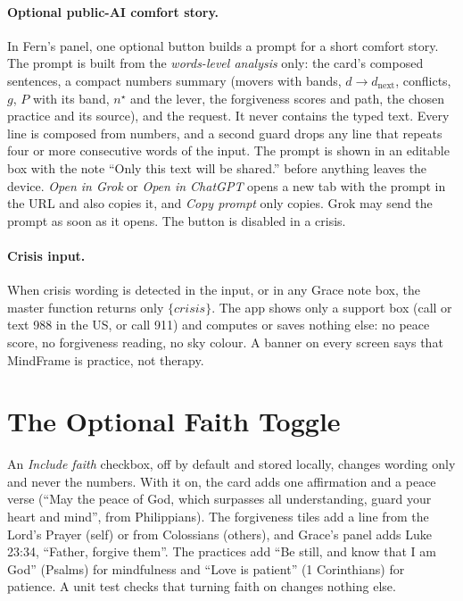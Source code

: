 \documentclass[10pt]{article}
\theoremstyle{definition}
\theoremstyle{remark}
\begin{document}
\paragraph{Optional public-AI comfort story.} In Fern's panel, one optional button builds a prompt for a short comfort story. The prompt is built from the \emph{words-level analysis} only: the card's composed sentences, a compact numbers summary (movers with bands, $d\to d_{\mathrm{next}}$, conflicts, $g$, $P$ with its band, $n^\star$ and the lever, the forgiveness scores and path, the chosen practice and its source), and the request. It never contains the typed text. Every line is composed from numbers, and a second guard drops any line that repeats four or more consecutive words of the input. The prompt is shown in an editable box with the note ``Only this text will be shared.'' before anything leaves the device. \emph{Open in Grok} or \emph{Open in ChatGPT} opens a new tab with the prompt in the URL and also copies it, and \emph{Copy prompt} only copies. Grok may send the prompt as soon as it opens. The button is disabled in a crisis.

\paragraph{Crisis input.} When crisis wording is detected in the input, or in any Grace note box, the master function returns only $\{\textit{crisis}\}$. The app shows only a support box (call or text 988 in the US, or call 911) and computes or saves nothing else: no peace score, no forgiveness reading, no sky colour. A banner on every screen says that MindFrame is practice, not therapy.

\section{The Optional Faith Toggle}
\label{sec:faith}
An \emph{Include faith} checkbox, off by default and stored locally, changes wording only and never the numbers. With it on, the card adds one affirmation and a peace verse (``May the peace of God, which surpasses all understanding, guard your heart and mind'', from Philippians). The forgiveness tiles add a line from the Lord's Prayer (self) or from Colossians (others), and Grace's panel adds Luke 23:34, ``Father, forgive them''. The practices add ``Be still, and know that I am God'' (Psalms) for mindfulness and ``Love is patient'' (1 Corinthians) for patience. A unit test checks that turning faith on changes nothing else.
\end{document}
